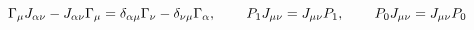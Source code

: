 \begin{equation}
\Gamma _\mu J_{\alpha \nu }-J_{\alpha \nu }\Gamma _\mu =\delta
_{\alpha \mu }\Gamma _\nu -\delta _{\nu \mu }\Gamma _\alpha
,\hspace{0.3in} P_1 J_{\mu\nu}=J_{\mu\nu}P_1 , \hspace{0.3in}P_0
J_{\mu\nu}=J_{\mu\nu}P_0 \label{46}
\end{equation}

